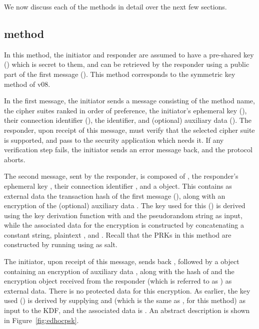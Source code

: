 {We now discuss each of the \mEdhoc{} methods in detail over the next few sections.

\subsection{\mPskPsk method}
In this method, the initiator and responder are assumed to have a pre-shared key (\mPsk) which is secret to them, and can be retrieved by the responder using a public part of the first message (\mIDPsk). This method corresponds to the symmetric key method of \mEdhoc{} v08. 

In the first message, the initiator sends a message consisting of the method name, the cipher suites ranked in order of preference, the initiator's ephemeral key (\mGx), their connection identifier (\mCi), the \mIDPsk identifier, and (optional) auxiliary data (\mADone). The responder, upon receipt of this message, must verify that the selected cipher suite is supported,  and pass \mADone to the security application which needs it. If any verification step fails, the initiator sends an \mEdhoc{} error message back, and the protocol aborts.

The second message, sent by the responder, is composed of \mCi, the responder's ephemeral key \mGy, their connection identifier \mCr, and a \mCose{} object. This contains as external data the transaction hash of the first message (\mTHtwo), along with an \mAead{} encryption of the (optional) auxiliary data \mADtwo. The key used for this (\mKtwoae) is derived using the \mEdhoc{} key derivation function with \mTHtwo and the pseudorandom string \mPRKtwo as input, while the associated data for the \mAead{} encryption is constructed by concatenating a constant string, plaintext \mhplain, and \mTHtwo. Recall that the PRKs in this method are constructed by running \mHkdfExtract{} using \mPsk{} as salt. 

The initiator, upon receipt of this message, sends back \mCr, followed by a \mCose object containing an \mAead encryption of auxiliary data \mADthree, along with the hash of \mTHtwo and the encryption object received from the responder (which is referred to as \mTHthree) as external data. There is no protected data for this encryption. As earlier, the key used (\mKthreeae) is derived by supplying \mTHthree and \mPRKthree (which is the same as \mPRKtwo, for this method) as input to the KDF, and the associated data is \mTHthree. An abstract description is shown in Figure~\ref{fig:edhocpsk}.

}
